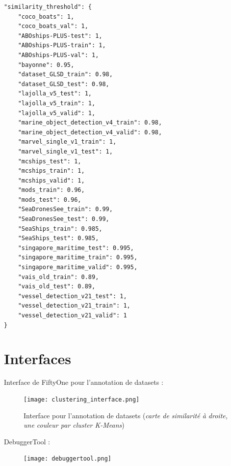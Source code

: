 \begin{verbatim}
"similarity_threshold": { 
    "coco_boats": 1, 
    "coco_boats_val": 1, 
    "ABOships-PLUS-test": 1, 
    "ABOships-PLUS-train": 1, 
    "ABOships-PLUS-val": 1, 
    "bayonne": 0.95, 
    "dataset_GLSD_train": 0.98, 
    "dataset_GLSD_test": 0.98, 
    "lajolla_v5_test": 1, 
    "lajolla_v5_train": 1, 
    "lajolla_v5_valid": 1, 
    "marine_object_detection_v4_train": 0.98, 
    "marine_object_detection_v4_valid": 0.98, 
    "marvel_single_v1_train": 1, 
    "marvel_single_v1_test": 1, 
    "mcships_test": 1, 
    "mcships_train": 1, 
    "mcships_valid": 1, 
    "mods_train": 0.96, 
    "mods_test": 0.96, 
    "SeaDronesSee_train": 0.99, 
    "SeaDronesSee_test": 0.99, 
    "SeaShips_train": 0.985, 
    "SeaShips_test": 0.985, 
    "singapore_maritime_test": 0.995, 
    "singapore_maritime_train": 0.995, 
    "singapore_maritime_valid": 0.995, 
    "vais_old_train": 0.89, 
    "vais_old_test": 0.89, 
    "vessel_detection_v21_test": 1, 
    "vessel_detection_v21_train": 1, 
    "vessel_detection_v21_valid": 1 
} 
\end{verbatim}
\label{seuils_similarite}

\pagebreak

\chapter{Interfaces}

\begin{landscape}
Interface de FiftyOne pour l'annotation de datasets : \\
    \begin{figure}[H]
        \centering
        \texttt{[image: clustering\_interface.png]}
        \caption{Interface pour l'annotation de datasets (\textit{carte de similarité à droite, 
        une couleur par cluster K-Means})}
    \end{figure}\label{clustering_interface}
\end{landscape}

\pagebreak

\begin{landscape}
    DebuggerTool : \\
        \begin{figure}[H]
            \centering
            \texttt{[image: debuggertool.png]}
        \end{figure}\label{debuggertool}
    \end{landscape}
    